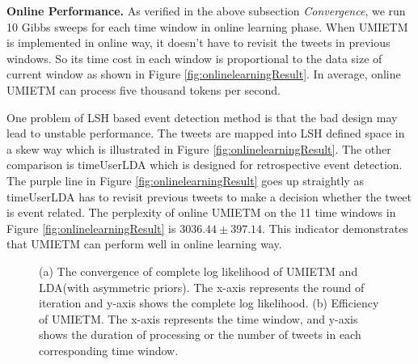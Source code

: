 \documentclass[runningheads,a4paper]{llncs}
\begin{document}
\textbf{Online Performance.}
As verified in the above subsection \textit{Convergence}, we run 10 Gibbs sweeps for each time window in online learning phase.
When UMIETM is implemented in online way, it doesn't have to revisit the tweets in previous windows. 
So its time cost in each window is proportional to the data size of current window  as shown in Figure \ref{fig:onlinelearningResult}.
In average, online UMIETM can process five thousand tokens per second.

One problem of LSH based event detection method is that the bad design may lead to unstable performance. 
The tweets are mapped into LSH defined space in a skew way which is illustrated in Figure \ref{fig:onlinelearningResult}.
The other comparison is timeUserLDA\cite{timeUserLDA2012finding} which is designed for retrospective event detection. 
The purple line in Figure \ref{fig:onlinelearningResult} goes up straightly as timeUserLDA has to revisit previous tweets to make a decision whether the tweet is event related. 
The perplexity of online UMIETM on the 11 time windows in Figure \ref{fig:onlinelearningResult} is \(3036.44\pm397.14\). 
This indicator demonstrates that UMIETM can perform well in online learning way. 
\begin{figure}
        \centering
        \caption{(a) The convergence of complete log likelihood of UMIETM and LDA(with asymmetric priors). The x-axis represents the round of iteration and y-axis shows the complete log likelihood. (b) Efficiency of UMIETM. The x-axis represents the time window, and y-axis shows the duration of processing or the number of tweets in each corresponding time window.}
\end{figure}
\end{document}
